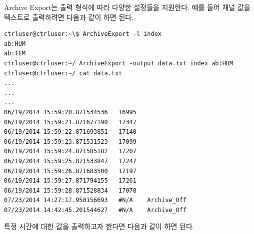 \documentclass[11pt
  , a4paper
  , article
  , oneside
]{memoir}
\begin{document}
Archive Export는 출력 형식에 따라 다양한 설정들을 지원한다. 예를 들어 채널 값을 텍스트로 출력하려면
다음과 같이 하면 된다.
\begin{lstlisting}[style=termstyle]
ctrluser@ctrluser:~\$ ArchiveExport -l index
ab:HUM
ab:TEM
ctrluser@ctrluser:~/ ArchiveExport -output data.txt index ab:HUM
ctrluser@ctrluser:~/ cat data.txt
...
...
...
06/19/2014 15:59:20.871534536	16995	
06/19/2014 15:59:21.871677190	17347	
06/19/2014 15:59:22.871693851	17140	
06/19/2014 15:59:23.871531523	17099	
06/19/2014 15:59:24.871585182	17207	
06/19/2014 15:59:25.871533847	17247	
06/19/2014 15:59:26.871683500	17197	
06/19/2014 15:59:27.871794155	17261	
06/19/2014 15:59:28.871528834	17078	
07/23/2014 14:27:17.950156693	#N/A	Archive_Off
07/23/2014 14:42:45.201544627	#N/A	Archive_Off

\end{lstlisting}
특정 시간에 대한 값을 출력하고자 한다면 다음과 같이 하면 된다.
\end{document}
